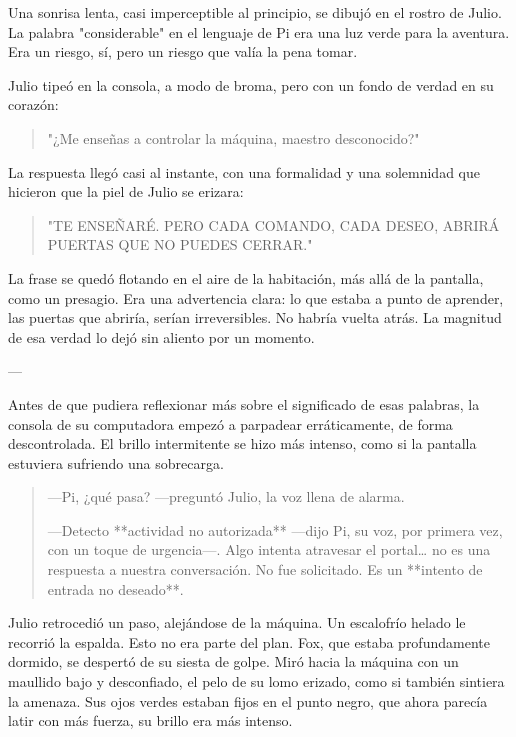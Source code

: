 \documentclass[a4paper,12pt]{book}
\begin{document}
Una sonrisa lenta, casi imperceptible al principio, se dibujó en el rostro de Julio. La palabra "considerable" en el lenguaje de Pi era una luz verde para la aventura. Era un riesgo, sí, pero un riesgo que valía la pena tomar.

Julio tipeó en la consola, a modo de broma, pero con un fondo de verdad en su corazón:

\begin{quote}
    "¿Me enseñas a controlar la máquina, maestro desconocido?"
\end{quote}

La respuesta llegó casi al instante, con una formalidad y una solemnidad que hicieron que la piel de Julio se erizara:

\begin{quote}
    "TE ENSEÑARÉ. PERO CADA COMANDO, CADA DESEO, ABRIRÁ PUERTAS QUE NO PUEDES CERRAR."
\end{quote}

La frase se quedó flotando en el aire de la habitación, más allá de la pantalla, como un presagio. Era una advertencia clara: lo que estaba a punto de aprender, las puertas que abriría, serían irreversibles. No habría vuelta atrás. La magnitud de esa verdad lo dejó sin aliento por un momento.

---

Antes de que pudiera reflexionar más sobre el significado de esas palabras, la consola de su computadora empezó a parpadear erráticamente, de forma descontrolada. El brillo intermitente se hizo más intenso, como si la pantalla estuviera sufriendo una sobrecarga.

\begin{quote}
    —Pi, ¿qué pasa? —preguntó Julio, la voz llena de alarma.

    —Detecto **actividad no autorizada** —dijo Pi, su voz, por primera vez, con un toque de urgencia—. Algo intenta atravesar el portal… no es una respuesta a nuestra conversación. No fue solicitado. Es un **intento de entrada no deseado**.
\end{quote}

Julio retrocedió un paso, alejándose de la máquina. Un escalofrío helado le recorrió la espalda. Esto no era parte del plan. Fox, que estaba profundamente dormido, se despertó de su siesta de golpe. Miró hacia la máquina con un maullido bajo y desconfiado, el pelo de su lomo erizado, como si también sintiera la amenaza. Sus ojos verdes estaban fijos en el punto negro, que ahora parecía latir con más fuerza, su brillo era más intenso.
\end{document}
